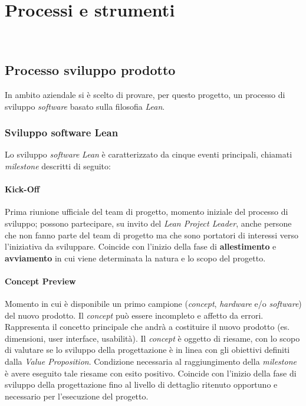 
\chapter{Processi e strumenti}
\label{cap:processi-metodologie}

\\

\section{Processo sviluppo prodotto}
In ambito aziendale si è scelto di provare, per questo progetto, un processo di sviluppo \emph{software} basato sulla filosofia \emph{Lean}.\\

\subsection{Sviluppo software Lean}
Lo sviluppo \emph{software} \emph{Lean} è caratterizzato da cinque eventi principali, chiamati \emph{milestone} descritti di seguito:\\


\subsubsection{Kick-Off}
Prima riunione ufficiale del team di progetto, momento iniziale del processo di sviluppo; possono partecipare, su invito del \emph{Lean Project Leader}, anche persone che non fanno parte del team di progetto ma che sono portatori di interessi verso l’iniziativa da sviluppare. Coincide con l’inizio della fase di \textbf{allestimento} e \textbf{avviamento} in cui viene determinata la natura e lo scopo del progetto.\\

\subsubsection{Concept Preview}
Momento in cui è disponibile un primo campione (\emph{concept}, \emph{hardware} e/o \emph{software}) del nuovo prodotto. Il \emph{concept} può essere incompleto e affetto da errori. Rappresenta il concetto principale che andrà a costituire il nuovo prodotto (es. dimensioni, user interface, usabilità). Il \emph{concept} è oggetto di riesame, con lo scopo di valutare se lo sviluppo della progettazione è in linea con gli obiettivi definiti dalla \emph{Value Proposition}. Condizione necessaria al raggiungimento della \emph{milestone} è avere eseguito tale riesame con esito positivo. Coincide con l’inizio della fase di sviluppo della progettazione fino al livello di dettaglio ritenuto opportuno e necessario per l’esecuzione del progetto.\\

